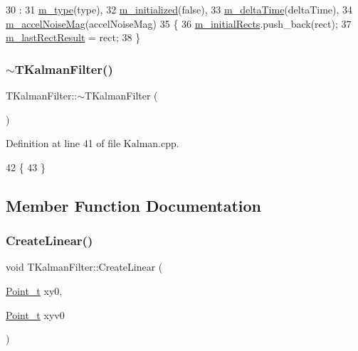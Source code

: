 \begin{DoxyCode}
30     :
31       \mbox{\hyperlink{class_t_kalman_filter_a00cabc6683f6cc848559515df46d7101}{m\_type}}(type),
32       \mbox{\hyperlink{class_t_kalman_filter_a5633e302e878261c8669816695f6a314}{m\_initialized}}(\textcolor{keyword}{false}),
33       \mbox{\hyperlink{class_t_kalman_filter_a7335e3bd7a695ebaf5eaa93c42e39eae}{m\_deltaTime}}(deltaTime),
34       \mbox{\hyperlink{class_t_kalman_filter_a9f511e8885e5e89643fa6d59ea7bbd27}{m\_accelNoiseMag}}(accelNoiseMag)
35 \{
36     \mbox{\hyperlink{class_t_kalman_filter_a76f15da72d3613b8ba41a9eb38faaeac}{m\_initialRects}}.push\_back(rect);
37     \mbox{\hyperlink{class_t_kalman_filter_aed4818c7aac455928ef02dd03f8bfe56}{m\_lastRectResult}} = rect;
38 \}
\end{DoxyCode}
\mbox{\label{class_t_kalman_filter_a19b5f44e8aadad2217ed3f2f370c8608}} 
\subsubsection{\texorpdfstring{$\sim$\+T\+Kalman\+Filter()}{~TKalmanFilter()}}
{\footnotesize\ttfamily T\+Kalman\+Filter\+::$\sim$\+T\+Kalman\+Filter (\begin{DoxyParamCaption}{ }\end{DoxyParamCaption})}



Definition at line 41 of file Kalman.\+cpp.


\begin{DoxyCode}
42 \{
43 \}
\end{DoxyCode}


\subsection{Member Function Documentation}
\mbox{\label{class_t_kalman_filter_a6b1bb8fb881f82ce0a766e6ea41f159c}} 
\subsubsection{\texorpdfstring{Create\+Linear()}{CreateLinear()}\hspace{0.1cm}{\footnotesize\ttfamily [1/2]}}
{\footnotesize\ttfamily void T\+Kalman\+Filter\+::\+Create\+Linear (\begin{DoxyParamCaption}\item[{\mbox{\hyperlink{defines_8h_a8c42696da8f098b91374a8e8bb84b430}{Point\+\_\+t}}}]{xy0,  }\item[{\mbox{\hyperlink{defines_8h_a8c42696da8f098b91374a8e8bb84b430}{Point\+\_\+t}}}]{xyv0 }\end{DoxyParamCaption})\hspace{0.3cm}{\ttfamily [private]}}



